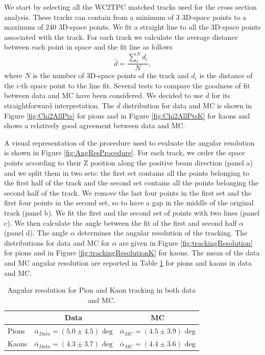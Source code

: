 We start by selecting all the WC2TPC matched tracks used for the cross section analysis.  These tracks can contain from a minimum of 3 3D-space points to a maximum of 240  3D-space points.  We fit a straight line to all the 3D-space points associated with the track. 
For each track we calculate the average distance between each point in space and the fit line as follows 
\begin{equation} 
\bar d = \frac{\sum^N_i d_i}{N},
\end{equation} 
where $N$ is the number of 3D-space points of the track and $d_i$ is the distance of the $i$-th space point to the line fit. Several tests to compare the goodness of fit between data and MC have been considered. We decided to use $\bar d$ for its straightforward interpretation. The $\bar d$ distribution for data and MC is shown in Figure \ref{fig:Chi2AllPts} for pions and in Figure \ref{fig:Chi2AllPtsK} for kaons and shows a relatively good agreement between data and MC.

A visual representation of the procedure used to evaluate the angular resolution is shown in Figure \ref{fig:AngResProcedure}. 
For each track, we order the space points according to their Z position along the positive beam direction (panel a) and we split them in two sets: the first set contains all the points belonging to the first half of the track and the second set contains all the points belonging the second half of the track. We remove the last four points in the first set and the first four points in the second set, so to have a gap in the middle of the original track (panel b). We fit the first and the second set of points with two lines  (panel c). We then calculate the angle between the fit of the first and second half $\alpha$ (panel d). The angle $\alpha$ determines the angular resolution of the tracking. The distributions for data and MC for $\alpha$ are given in Figure \ref{fig:trackingResolution} for pions and in Figure \ref{fig:trackingResolutionK} for kaons. The mean of the data and MC angular resolution are reported in Table \ref{tab:AngRes} for pions and kaons in data and MC.



\begin{table}[b]
\centering
\begin{tabular}{|l|c|c|}  
\hline
                      &       Data          & MC     \\ \hline
Pions             &   $\bar\alpha_{Data} = (5.0 \pm 4.5) \text{ deg}$          & $\bar\alpha_{MC} = (4.5 \pm 3.9) \text{ deg}$ \\ \hline
Kaons            &   $\bar\alpha_{Data} = (4.3 \pm 3.7) \text{ deg}$          & $\bar\alpha_{MC} = (4.4 \pm 3.6) \text{ deg}$  \\ \hline
\end{tabular}
\caption{Angular resolution for Pion and Kaon tracking in both data and MC.}
\label{tab:AngRes}
\end{table}


